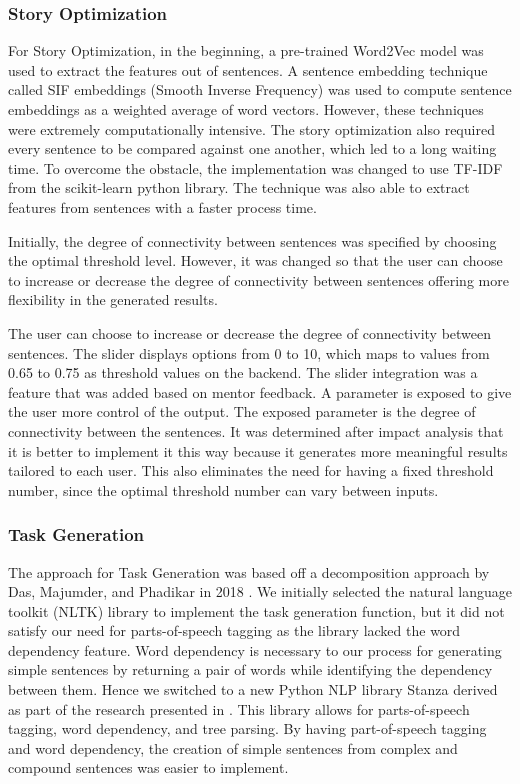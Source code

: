 \subsubsection{Story Optimization}
For Story Optimization, in the beginning, a pre-trained Word2Vec model was used to extract the features out of sentences. A sentence embedding technique called SIF embeddings (Smooth Inverse Frequency) was used to compute sentence embeddings as a weighted average of word vectors. However, these techniques were extremely computationally intensive. The story optimization also required every sentence to be compared against one another, which led to a long waiting time. To overcome the obstacle, the implementation was changed to use TF-IDF from the scikit-learn python library. The technique was also able to extract features from sentences with a faster process time.

Initially, the degree of connectivity between sentences was specified by choosing the optimal threshold level. However, it was changed so that the user can choose to increase or decrease the degree of connectivity between sentences offering more flexibility in the generated results.

The user can choose to increase or decrease the degree of connectivity between sentences. The slider displays options from 0 to 10, which maps to values from 0.65 to 0.75 as threshold values on the backend. The slider integration was a feature that was added based on mentor feedback. A parameter is exposed to give the user more control of the output. The exposed parameter is the degree of connectivity between the sentences. It was determined after impact analysis that it is better to implement it this way because it generates more meaningful results tailored to each user. This also eliminates the need for having a fixed threshold number, since the optimal threshold number can vary between inputs.

\subsubsection{Task Generation}
The approach for Task Generation was based off a decomposition approach by Das, Majumder, and Phadikar in 2018 \cite{NLP1}. We initially selected the natural language toolkit (NLTK) library \cite{nltk} to implement the task generation function, but it did not satisfy our need for parts-of-speech tagging as the library lacked the word dependency feature. Word dependency is necessary to our process for generating simple sentences by returning a pair of words while identifying the dependency between them. Hence we switched to a new Python NLP library Stanza \cite{stanza} derived as part of the research presented in \cite{NLP1}. This library allows for parts-of-speech tagging, word dependency, and tree parsing. By having part-of-speech tagging and word dependency, the creation of simple sentences from complex and compound sentences was easier to implement.

